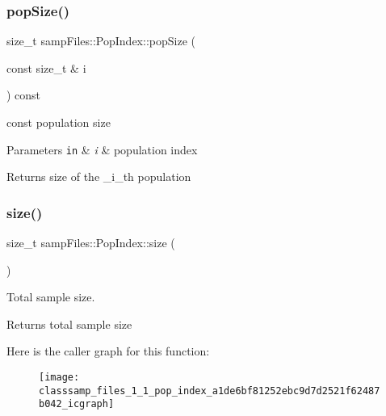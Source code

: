 \subsubsection{\texorpdfstring{pop\+Size()}{popSize()}\hspace{0.1cm}{\footnotesize\ttfamily [2/2]}}
{\footnotesize\ttfamily size\+\_\+t samp\+Files\+::\+Pop\+Index\+::pop\+Size (\begin{DoxyParamCaption}\item[{const size\+\_\+t \&}]{i }\end{DoxyParamCaption}) const\hspace{0.3cm}{\ttfamily [inline]}}



{\ttfamily const} population size 


\begin{DoxyParams}[1]{Parameters}
\mbox{\tt in}  & {\em i} & population index \\
\hline
\end{DoxyParams}
\begin{DoxyReturn}{Returns}
size of the \+\_\+i\+\_\+th population 
\end{DoxyReturn}
\mbox{\label{classsamp_files_1_1_pop_index_a1de6bf81252ebc9d7d2521f62487b042}} 
\subsubsection{\texorpdfstring{size()}{size()}\hspace{0.1cm}{\footnotesize\ttfamily [1/2]}}
{\footnotesize\ttfamily size\+\_\+t samp\+Files\+::\+Pop\+Index\+::size (\begin{DoxyParamCaption}{ }\end{DoxyParamCaption})\hspace{0.3cm}{\ttfamily [inline]}}



Total sample size. 

\begin{DoxyReturn}{Returns}
total sample size 
\end{DoxyReturn}
Here is the caller graph for this function\+:\nopagebreak
\begin{figure}[H]
\begin{center}
\leavevmode
\texttt{[image: classsamp\_files\_1\_1\_pop\_index\_a1de6bf81252ebc9d7d2521f62487b042\_icgraph]}
\end{center}
\end{figure}
\mbox{\label{classsamp_files_1_1_pop_index_a251a3004894d15691b6f12adb84b0ad5}} 
